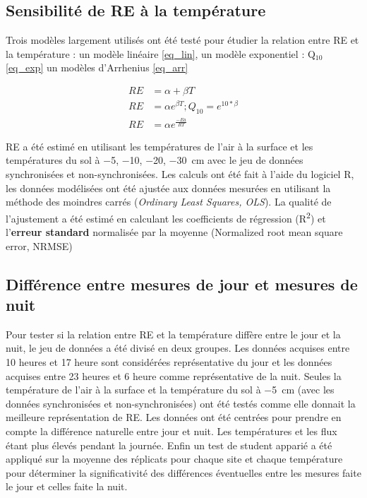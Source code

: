 \subsection{Sensibilité de RE à la température}
Trois modèles largement utilisés \citet{fang2001} ont été testé pour étudier la relation entre RE et la température : un modèle linéaire \eqref{eq_lin}, un modèle exponentiel : Q$_{10}$ \eqref{eq_exp} un modèles d'Arrhenius \eqref{eq_arr}

\begin{align}
RE & = \alpha + \beta T \label{eq_lin}\\
RE & = \alpha e^{\beta T} ; Q_{10}=e^{10*\beta} \label{eq_exp}\\
RE & = \alpha e^{\frac{-Ea}{RT}} \label{eq_arr}
\end{align}

RE a été estimé en utilisant les températures de l'air à la surface et les températures du sol à \num{-5}, \num{-10}, \num{-20}, \SI{-30}{\centi\metre} avec le jeu de données synchronisées et non-synchronisées.
Les calculs ont été fait à l'aide du logiciel R, les données modélisées ont été ajustée aux données mesurées en utilisant la méthode des moindres carrés (\textit{Ordinary Least Squares, OLS}).
La qualité de l'ajustement a été estimé en calculant les coefficients de régression (R\textsuperscript{2}) et l'\textbf{erreur standard} normalisée par la moyenne (Normalized root mean square error, NRMSE)


\subsection{Différence entre mesures de jour et mesures de nuit}
Pour tester si la relation entre RE et la température diffère entre le jour et la nuit, le jeu de données a été divisé en deux groupes.
Les données acquises entre 10 heures et 17 heure sont considérées représentative du jour et les données acquises entre 23 heures et 6 heure comme représentative de la nuit.
Seules la température de l'air à la surface et la température du sol à \SI{-5}{\centi\metre} (avec les données synchronisées et non-synchronisées) ont été testés comme elle donnait la meilleure représentation de RE.
Les données ont été centrées pour prendre en compte la différence naturelle entre jour et nuit.
Les températures et les flux étant plus élevés pendant la journée.
Enfin un test de student apparié a été appliqué sur la moyenne des réplicats pour chaque site et chaque température pour déterminer la significativité des différences éventuelles entre les mesures faite le jour et celles faite la nuit.

